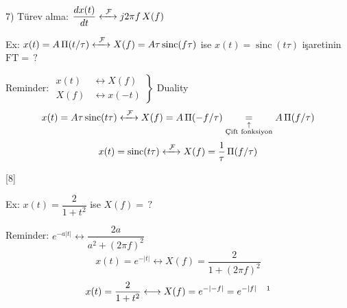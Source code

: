 \documentclass[11pt,a4paper]{article}
\begin{document}
7) Türev alma: \quad $\dfrac{dx(t)}{dt} \xleftrightarrow{\ \mathcal{F}\ } j2\pi f\,X(f)$

\begin{ornek}
Ex: $x(t)=A\,\Pi(t/\tau) \xleftrightarrow{\ \mathcal{F}\ } X(f)=A\tau\operatorname{sinc}(f\tau)$ ise $x(t)=\operatorname{sinc}(t\tau)$ işaretinin $\text{FT}=\,?$
\end{ornek}
Reminder: \quad $\left.\begin{aligned} x(t)&\longleftrightarrow X(f)\\ X(f)&\longleftrightarrow x(-t)\end{aligned}\right\}$ Duality
\[ x(t)=A\tau\operatorname{sinc}(t\tau) \xleftrightarrow{\ \mathcal{F}\ } X(f)=A\,\Pi(-f/\tau)\underset{\substack{\uparrow\\ \text{Çift fonksiyon}}}{=}A\,\Pi(f/\tau) \]
\[ x(t)=\operatorname{sinc}(t\tau) \xleftrightarrow{\ \mathcal{F}\ } X(f)=\frac{1}{\tau}\,\Pi(f/\tau) \]

[8]

\begin{ornek}
Ex: $x(t)=\dfrac{2}{1+t^2}$ ise $X(f)=\,?$
\end{ornek}
Reminder: \quad $e^{-a|t|} \longleftrightarrow \dfrac{2a}{a^2+(2\pi f)^2}$
\[ x(t)=e^{-|t|} \longleftrightarrow X(f)=\frac{2}{1+(2\pi f)^2} \]
\[ x(t)=\frac{2}{1+t^2} \longleftrightarrow X(f)=e^{-|-f|}=e^{-|f|}\quad\text{\footnotemark} \]
\end{document}
